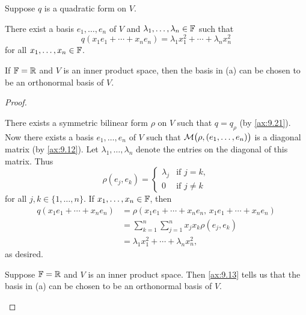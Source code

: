 \begin{result}\label{ax:9.23}
Suppose $q$ is a quadratic form on $V$.
\begin{parts}
\item There exist a basis $e_1,\dots,e_n$ of $V$ and
  $\lambda_1,\dots,\lambda_n\in\mathbb{F}$ such that
  \[ q(x_1e_1+\cdots+x_ne_n) = \lambda_1x_1^2+\cdots+\lambda_nx_n^2 \]
  for all $x_1,\dots,x_n\in\mathbb{F}$.
\item If $\mathbb{F}=\mathbb{R}$ and $V$ is an inner product space, then the basis in (a) can
  be chosen to be an orthonormal basis of $V$.
\end{parts}
\end{result}

\begin{proof}\leavevmode
\begin{parts}
\item There exists a symmetric bilinear form $\rho$ on $V$ such that
  $q=q_\rho$ (by \ref{ax:9.21}). Now there exists a basis $e_1,\dots,e_n$ of
  $V$ such that $\mathcal{M}\bigl(\rho,(e_1,\dots,e_n)\bigr)$ is a diagonal matrix
  (by \ref{ax:9.12}). Let $\lambda_1,\dots,\lambda_n$ denote the entries on the
  diagonal of this matrix. Thus
  \[ \rho(e_j,e_k) = \begin{cases} \lambda_j & \text{if } j=k,\\
     0 & \text{if } j\ne k \end{cases} \]
  for all $j,k\in\{1,\dots,n\}$. If $x_1,\dots,x_n\in\mathbb{F}$, then
  \begin{align*}
  q(x_1e_1+\cdots+x_ne_n)
    &= \rho(x_1e_1+\cdots+x_ne_n,\,x_1e_1+\cdots+x_ne_n)\\
    &= \sum_{k=1}^n\sum_{j=1}^n x_jx_k\rho(e_j,e_k)\\
    &= \lambda_1x_1^2+\cdots+\lambda_nx_n^2,
  \end{align*}
  as desired.
\item Suppose $\mathbb{F}=\mathbb{R}$ and $V$ is an inner product space. Then \ref{ax:9.13}
  tells us that the basis in (a) can be chosen to be an orthonormal basis of
  $V$.\qedhere
\end{parts}
\end{proof}

